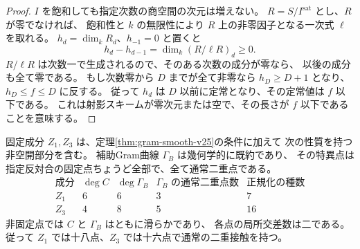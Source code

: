 \begin{proof}
$I$ を飽和しても指定次数の商空間の次元は増えない。
$R=S/I^{\mathrm{sat}}$ とし、$R$ が零でなければ、
飽和性と $k$ の無限性により $R$ 上の非零因子となる一次式 $\ell$ を取れる。
$h_d=\dim_k R_d$、$h_{-1}=0$ と置くと
\[
 h_d-h_{d-1}=\dim_k(R/\ell R)_d\geq0.
\]
$R/\ell R$ は次数一で生成されるので、そのある次数の成分が零なら、
以後の成分も全て零である。
もし次数零から $D$ までが全て非零なら $h_D\geq D+1$ となり、
$h_D\leq f\leq D$ に反する。
従って $h_d$ は $D$ 以前に定常となり、その定常値は $f$ 以下である。
これは射影スキームが零次元または空で、その長さが $f$ 以下であることを意味する。
\end{proof}

\begin{theorem}[補助曲線の特異点の完全な決定]
\label{thm:complementary-gram-nodal-v26}
固定成分 $Z_1,Z_3$ は、定理\ref{thm:gram-smooth-v25}の条件に加えて
次の性質を持つ非空開部分を含む。
補助Gram曲線 $\Gamma_B$ は幾何学的に既約であり、
その特異点は指定反対合の固定点ちょうど全部で、全て通常二重点である。
\[
\begin{array}{c|c|c|c|c}
 \text{成分}&\deg C&\deg\Gamma_B&
 \Gamma_B\text{ の通常二重点数}&\text{正規化の種数}\\\hline
 Z_1&6&6&3&7\\
 Z_3&4&8&5&16
\end{array}
\]
非固定点では $C$ と $\Gamma_B$ はともに滑らかであり、
各点の局所交差数は二である。
従って $Z_1$ では十八点、$Z_3$ では十六点で通常の二重接触を持つ。
\end{theorem}

